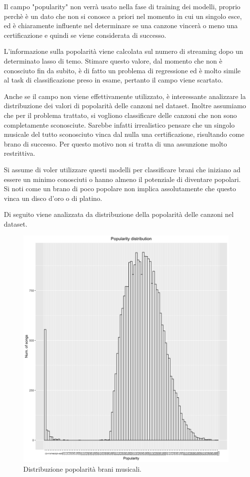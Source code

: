 Il campo "popularity" non verrà usato nella fase di training dei
modelli, proprio perchè è un dato che non si conosce a priori nel
momento in cui un singolo esce, ed è chiaramente influente nel
determinare se una canzone vincerà o meno una certificazione e quindi
se viene considerata di successo.

L'informazione sulla popolarità viene calcolata sul numero di
streaming dopo un determinato lasso di temo. Stimare questo valore,
dal momento che non è conosciuto fin da subito, è di fatto un problema
di regressione ed è molto simile al task di classificazione preso in
esame, pertanto il campo viene scartato.

Anche se il campo non viene effettivamente utilizzato, è interessante
analizzare la distribuzione dei valori di popolarità delle canzoni nel
dataset. Inoltre assumiamo che per il problema trattato, si vogliono
classificare delle canzoni che non sono completamente
sconosciute. Sarebbe infatti irrealistico pensare che un singolo
musicale del tutto sconosciuto vinca dal nulla una certificazione,
risultando come brano di successo.  Per questo motivo non si tratta di
una assunzione molto restrittiva.

Si assume di voler utilizzare questi modelli per classificare brani
che iniziano ad essere un minimo conosciuti o hanno almeno il
potenziale di diventare popolari. Si noti come un brano di poco
popolare non implica assolutamente che questo vinca un disco d'oro o
di platino.

Di seguito viene analizzata da distribuzione della popolarità delle
canzoni nel dataset.


\begin{figure}[H]
	\centering
	\includegraphics[width=13cm]{../images/popularity_distribution.png}
	\caption{Distribuzione popolarità brani musicali.}
\end{figure}

